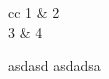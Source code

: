 \begin{myother}{cc}%
	1 & 2 \\
	3 & 4 \\
\end{myother}

\begin{other}
	asdasd
	asdadsa
\end{other}

